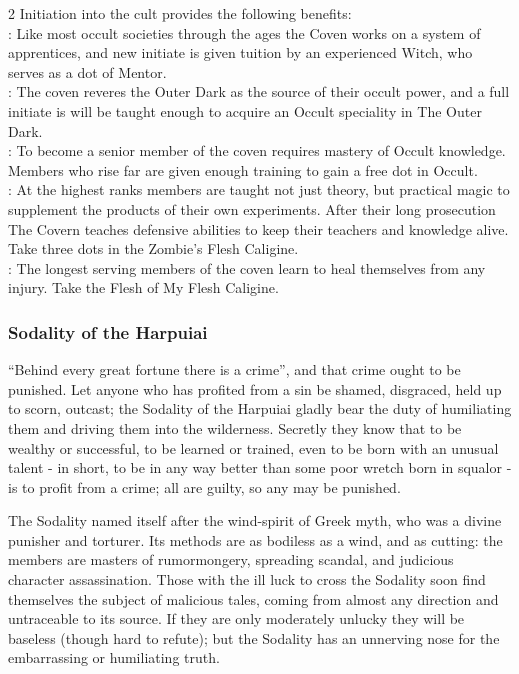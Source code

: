 \begin{multicols}{2}
Initiation into the cult provides the following benefits: \\

\noindent \textbullet: Like most occult societies through the ages the Coven works on a system of apprentices, and new initiate is given tuition by an experienced Witch, who serves as a dot of Mentor.\\
\noindent \textbullet\textbullet: The coven reveres the Outer Dark as the source of their occult power, and a full initiate is will be taught enough to acquire an Occult speciality in The Outer Dark.\\
\noindent \textbullet\textbullet\textbullet: To become a senior member of the coven requires mastery of Occult knowledge. Members who rise far are given enough training to gain a free dot in Occult.\\
\noindent \textbullet\textbullet\textbullet\textbullet: At the highest ranks members are taught not just theory, but practical magic to supplement the products of their own experiments. After their long prosecution The Covern teaches defensive abilities to keep their teachers and knowledge alive. Take three dots in the Zombie's Flesh Caligine.\\
\noindent \textbullet\textbullet\textbullet\textbullet\textbullet: The longest serving members of the coven learn to heal themselves from any injury. Take the Flesh of My Flesh Caligine.

\subsubsection*{Sodality of the Harpuiai}
\textquotedblleft Behind every great fortune there is a crime\textquotedblright, and that crime ought to be punished. Let anyone who has profited from a sin be shamed, disgraced, held up to scorn, outcast; the Sodality of the Harpuiai gladly bear the duty of humiliating them and driving them into the wilderness. Secretly they know that to be wealthy or successful, to be learned or trained, even to be born with an unusual talent - in short, to be in any way better than some poor wretch born in squalor - is to profit from a crime; all are guilty, so any may be punished.

The Sodality named itself after the wind-spirit of Greek myth, who was a divine punisher and torturer. Its methods are as bodiless as a wind, and as cutting: the members are masters of rumormongery, spreading scandal, and judicious character assassination. Those with the ill luck to cross the Sodality soon find themselves the subject of malicious tales, coming from almost any direction and untraceable to its source. If they are only moderately unlucky they will be baseless (though hard to refute); but the Sodality has an unnerving nose for the embarrassing or humiliating truth.


\end{multicols}
